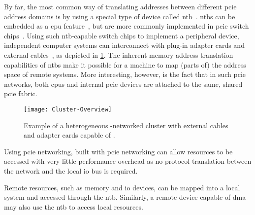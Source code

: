 By far, the most common way of translating addresses between different \gls{pcie} address domains is by using a special type of device called \gls{ntb}~\cite{whitepaper:PLX,whitepaper:Regula2004,Tu2018}.
%
\Glspl{ntb} can be embedded as a \gls{cpu} feature~\cite{whitepaper:Sullivan2010,url:LinuxNTB-AMD}, but are more commonly implemented in \gls{pcie} switch chips~\cite{whitepaper:PLX,pex8733}.
%
Using such \gls{ntb}-capable switch chips to implement a peripheral device, independent computer systems can interconnect with plug-in adapter cards and external cables~\cite{Ravindran2008,Lim2019,Tu2014,Tu2018}, as depicted in \cref{fig:cluster-example}.
%
The inherent memory address translation capabilities of \glspl{ntb} make it possible for a machine to map (parts of) the address space of remote systems.
%
More interesting, however, is the fact that in such \gls{pcie} networks, both \glspl{cpu} and internal \gls{pcie} devices are attached to the same, shared \gls{pcie} fabric.

\begin{figure}
	\centering
	\texttt{[image: Cluster-Overview]}
    \caption{Example of a heterogeneous -networked cluster with external cables and adapter cards capable of .}
  	\label{fig:cluster-example}
\end{figure}


Using \gls{pcie} networking, built with \gls{pcie} networking can allow resources to be accessed with very little performance overhead as no protocol translation between the network and the local \gls{io} bus is required.


Remote resources, such as memory and \gls{io} devices, can be mapped into a local system and accessed through the \gls{ntb}.
Similarly, a remote device capable of \gls{dma} may also use the \gls{ntb} to access local resources.

